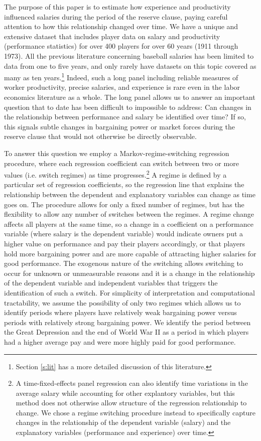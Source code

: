 \documentclass[12pt]{article}
\begin{document}
The purpose of this paper is to estimate how experience and productivity influenced salaries during the period of the reserve clause, paying careful attention to how this relationship changed over time.  We have a unique and extensive dataset that includes player data on salary and productivity (performance statistics) for over 400 players for over 60 years (1911 through 1973).  All the previous literature concerning baseball salaries has been limited to data from one to five years, and only rarely have datasets on this topic covered as many as ten years.\footnote{Section \ref{s:lit} has a more detailed discussion of this literature.}  Indeed, such a long panel including reliable measures of worker productivity, precise salaries, and experience is rare even in the labor economics literature as a whole.  The long panel allows us to answer an important question that to date has been difficult to impossible to address: Can changes in the relationship between performance and salary be identified over time?  If so, this signals subtle changes in bargaining power or market forces during the reserve clause that would not otherwise be directly observable.

To answer this question we employ a Markov-regime-switching regression procedure, where each regression coefficient can switch between two or more values (i.e. switch regimes) as time progresses.\footnote{A time-fixed-effects panel regression can also identify time variations in the average salary while accounting for other explantory variables, but this method does not otherwise allow structure of the regression relationship to change.  We chose a regime switching procedure instead to specifically capture changes in the relationship of the dependent variable (salary) and the explanatory variables (performance and experience) over time.}  A regime is defined by a particular set of regression coefficients, so the regression line that explains the relationship between the dependent and explanatory variables can change as time goes on.  The procedure allows for only a fixed number of regimes, but has the flexibility to allow any number of switches between the regimes.  A regime change affects all players at the same time, so a change in a coefficient on a performance variable (where salary is the dependent variable) would indicate owners put a higher value on performance and pay their players accordingly, or that players hold more bargaining power and are more capable of attracting higher salaries for good performance.  The exogenous nature of the switching allows switching to occur for unknown or unmeasurable reasons and it is a change in the relationship of the dependent variable and independent variables that triggers the identification of such a switch.  For simplicity of interpretation and computational tractability, we assume the possibility of only two regimes which allows us to identify periods where players have relatively weak bargaining power versus periods with relatively strong bargaining power.  We identify the period between the Great Depression and the end of World War II as a period in which players had a higher average pay and were more highly paid for good performance.
\end{document}
